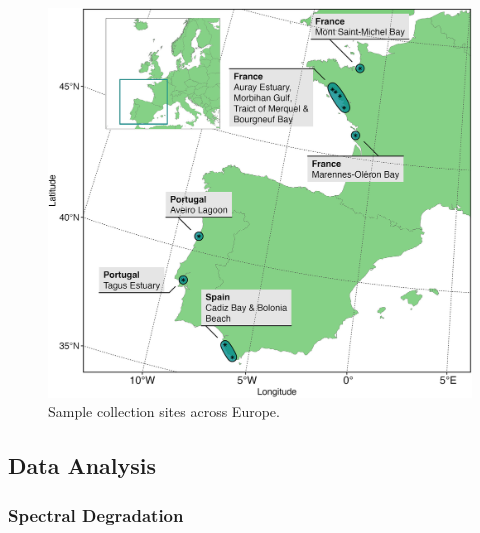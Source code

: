 \documentclass[
  letterpaper,
  11pt,
  english,
  singlespacing,
  headsepline]{MastersDoctoralThesis}
\begin{document}
\begin{spacing}{1.5}
\begin{figure}
{\includegraphics[width=0.95\linewidth,height=\textheight,keepaspectratio]{Chapter2/Figs/Figure2.jpg}

}

\caption{\label{fig-FIGMAP}Sample collection sites across Europe.}

\end{figure}%

\subsection{Data Analysis}\label{data-analysis}

\subsubsection{Spectral Degradation}\label{spectral-degradation}


\end{spacing}
\end{document}
